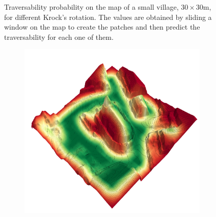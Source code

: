 \documentclass[../document.tex]{subfiles}
\begin{document}
\begin{figure}[H]
\begin{subfigure}[b]{0.45\textwidth}
  \end{subfigure}
  \caption{Traversability probability on the map of a small village, $30\times 30$m, for different Krock's rotation. The values are obtained by sliding a window on the map to create the patches and then predict the traversability for each one of them.}
  \end{figure}

  \begin{figure}[H]
    \centering
    \begin{subfigure}[b]{0.45\textwidth}
      \includegraphics[width=\linewidth]{../img/4/traversability/sullens-church/-270.png} 
    \end{subfigure}
    \begin{subfigure}[b]{0.45\textwidth}

\end{subfigure}
\end{figure}
\end{document}
